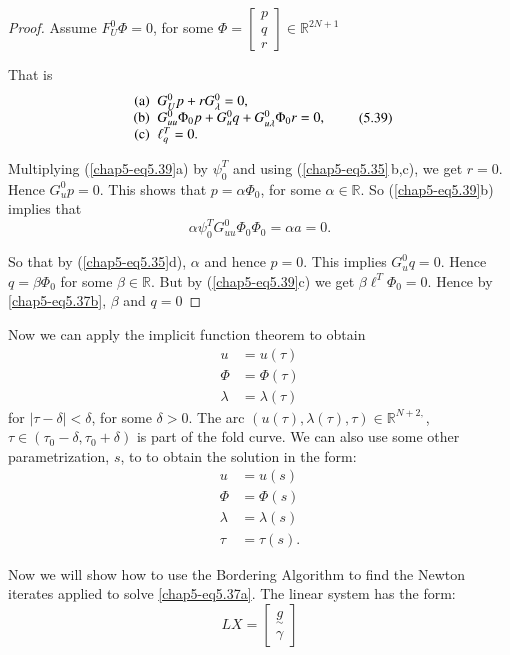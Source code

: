 \begin{proof}%
Assume $F^0_U \Phi =0$, for some $\Phi= \begin{bmatrix} p
  \\q\\r\end{bmatrix}  \in \mathbb{R}^{2N+1}$ 

That is 
\begin{equation*}
\begin{array}{r@{\;\;}l}
\text{(a)} & G^0_Up+ r G^0_{\lambda} =0,\\ 
\text{(b)} & G^0_{uu} \Phi_0 p + G^0_uq + G^0_{u \lambda}\Phi_0
r=0,\\ 
\text{(c)} & \ell^T_q =0.
\end{array}\tag{5.39}\label{chap5-eq5.39}
\end{equation*}

Multiplying (\ref{chap5-eq5.39}a) by  $\psi^T_0$ and using
(\ref{chap5-eq5.35}\,b,c), we get 
$r=0$. Hence $G^0_u p=0$. This  shows that $p= \alpha \Phi _0$, for
some $\alpha \in \mathbb{R}$. So (\ref{chap5-eq5.39}b) implies that  
$$
\alpha \psi^T_0 G^0_{uu} \Phi _0 \Phi_0 = \alpha a=0. 
$$

So that by (\ref{chap5-eq5.35}d), $\alpha$ and hence $p=0$. This implies
$G^0_uq=0$. Hence $q= \beta\Phi _0$ for some $\beta \in
\mathbb{R}$. But by (\ref{chap5-eq5.39}c) we get $\beta \ell^T \Phi_0 =0$. Hence
by \eqref{chap5-eq5.37b}, $\beta$ and $q=0$ 
\end{proof}

Now we can apply the implicit function theorem to obtain 
\begin{align*}
u &= u(\tau)\\
\Phi &= \Phi(\tau)\\
\lambda &=\lambda (\tau)
\end{align*}\pageoriginale
for $| \tau- \delta| < \delta$, for  some $\delta >0$. The arc $( u
(\tau), \lambda (\tau), \tau) \in \mathbb{R}^{N+2,}$, $\tau
\in(\tau_0 - \delta, \tau_0 + \delta)$ is part of the fold
curve. We can also use some other  parametrization, $s$, to to obtain
the solution in the form: 
\begin{align*}
u &= u(s)\\
\Phi &= \Phi(s)\\
\lambda &= \lambda(s)\\
\tau &=\tau(s).
\end{align*}

Now we will show how to use the Bordering Algorithm to find the Newton
iterates applied to solve \eqref{chap5-eq5.37a}. The linear system has
the form:  
\begin{equation*}
LX = 
\begin{bmatrix}
 \underset{\sim}{g} \\
 \gamma 
\end{bmatrix}
\tag{5.40} \label{chap5-eq5.40}
\end{equation*}

